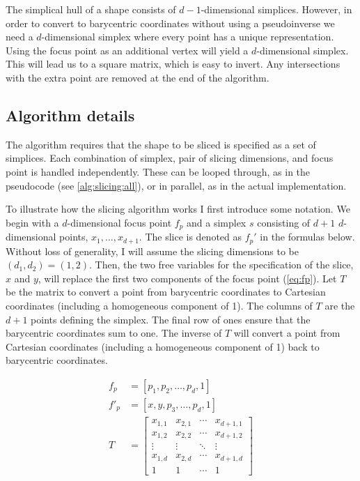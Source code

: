 The simplical hull of a shape consists of $d-1$-dimensional simplices. However, in
order to convert to barycentric coordinates without using a pseudoinverse we
need a $d$-dimensional simplex where every point has a unique representation.
Using the focus point as an additional vertex will yield a $d$-dimensional 
simplex.
This will lead us to a square matrix, which is easy to
invert.  Any intersections with the extra point are removed at the end of the
algorithm.

\subsection{Algorithm details}

The algorithm requires that the shape to be sliced is specified as a set of
simplices. Each combination of simplex, pair of slicing dimensions, and focus
point is handled independently. These can be looped through, as in the
pseudocode (see \autoref{alg:slicing:all}), or in parallel, as in the actual
implementation.

To illustrate how the slicing algorithm works I first introduce some notation.  
We begin with a $d$-dimensional focus point $f_p$ and a simplex $s$
consisting of $d+1$ $d$-dimensional points, $x_1, \ldots, x_{d+1}$. 
The slice is denoted as $f_p'$ in the formulas below. Without loss of generality, 
I will
assume the slicing dimensions to be $(d_1,d_2)=(1,2)$. Then, the two free
variables for the specification of the slice, $x$ and $y$, will replace the
first two components of the focus point (\autoref{eq:fp}). 
Let $T$
be the matrix to convert a point from barycentric coordinates to Cartesian
coordinates (including a homogeneous component of 1). The columns of $T$ are the $d+1$ points defining the simplex. The final row
of ones ensure that the barycentric coordinates sum to one. The inverse
of $T$ will convert a point from Cartesian coordinates (including a homogeneous component of 1) back to barycentric coordinates.

\begin{align}
  f_p &= [p_1, p_2, \ldots, p_d,1] \\
  f'_p &= [x, y, p_3, \ldots, p_d, 1] \label{eq:fp} \\
  T &= 
    \begin{bmatrix}
      x_{1,1} & x_{2,1} & \cdots & x_{d+1,1} \\
      x_{1,2} & x_{2,2} & \cdots & x_{d+1,2} \\
      \vdots  & \vdots  & \ddots & \vdots    \\
      x_{1,d} & x_{2,d} & \cdots & x_{d+1,d} \\
      1       & 1       & \cdots & 1         
    \end{bmatrix} \\
\end{align}


